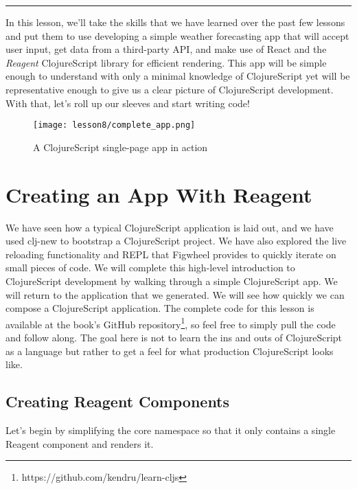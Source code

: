\documentclass[10pt,twoside,openright]{memoir}
\begin{document}
\begin{center}\rule{0.5\linewidth}{0.5pt}\end{center}

In this lesson, we'll take the skills that we have learned over the past
few lessons and put them to use developing a simple weather forecasting
app that will accept user input, get data from a third-party API, and
make use of React and the \emph{Reagent} ClojureScript library for
efficient rendering. This app will be simple enough to understand with
only a minimal knowledge of ClojureScript yet will be representative
enough to give us a clear picture of ClojureScript development. With
that, let's roll up our sleeves and start writing code!

\begin{figure}[H]
\caption{A ClojureScript single-page app in action}
\centering
\texttt{[image: lesson8/complete\_app.png]}
\end{figure}

\section{Creating an App With Reagent}

We have seen how a typical ClojureScript application is laid out, and we
have used clj-new to bootstrap a ClojureScript project. We have also
explored the live reloading functionality and REPL that Figwheel
provides to quickly iterate on small pieces of code. We will complete
this high-level introduction to ClojureScript development by walking
through a simple ClojureScript app. We will return to the application
that we generated. We will see how quickly we can compose a
ClojureScript application. The complete code for this lesson is
available at the book's GitHub repository\footnote{https://github.com/kendru/learn-cljs}, so feel free to simply pull the code and follow
along. The goal here is not to learn the ins and outs of ClojureScript
as a language but rather to get a feel for what production ClojureScript
looks like.

\subsection{Creating Reagent Components}

Let's begin by simplifying the core namespace so that it only contains a
single Reagent component and renders it.
\end{document}
